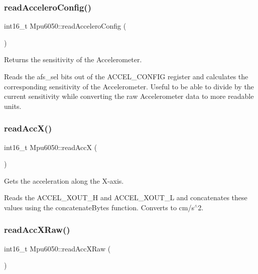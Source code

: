 \subsubsection{\texorpdfstring{read\+Accelero\+Config()}{readAcceleroConfig()}}
{\footnotesize\ttfamily int16\+\_\+t Mpu6050\+::read\+Accelero\+Config (\begin{DoxyParamCaption}{ }\end{DoxyParamCaption})\hspace{0.3cm}{\ttfamily [virtual]}}



Returns the sensitivity of the Accelerometer. 

Reads the afs\+\_\+sel bits out of the A\+C\+C\+E\+L\+\_\+\+C\+O\+N\+F\+IG register and calculates the corresponding sensitivity of the Accelerometer. Useful to be able to divide by the current sensitivity while converting the raw Accelerometer data to more readable units. \mbox{\label{classMpu6050_aa79e259de84f90235cc62e7fa10d2ebe}} 
\subsubsection{\texorpdfstring{read\+Acc\+X()}{readAccX()}}
{\footnotesize\ttfamily int16\+\_\+t Mpu6050\+::read\+AccX (\begin{DoxyParamCaption}{ }\end{DoxyParamCaption})\hspace{0.3cm}{\ttfamily [virtual]}}



Gets the acceleration along the X-\/axis. 

Reads the A\+C\+C\+E\+L\+\_\+\+X\+O\+U\+T\+\_\+H and A\+C\+C\+E\+L\+\_\+\+X\+O\+U\+T\+\_\+L and concatenates these values using the concatenate\+Bytes function. Converts to cm/s$^\wedge$2. \mbox{\label{classMpu6050_a531fe38ae4d91c404863b594bb022ed3}} 
\subsubsection{\texorpdfstring{read\+Acc\+X\+Raw()}{readAccXRaw()}}
{\footnotesize\ttfamily int16\+\_\+t Mpu6050\+::read\+Acc\+X\+Raw (\begin{DoxyParamCaption}{ }\end{DoxyParamCaption})\hspace{0.3cm}{\ttfamily [virtual]}}



